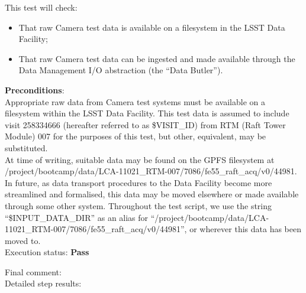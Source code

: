 \documentclass[DM,lsstdraft,STR,toc]{lsstdoc}
\providecommand{\tightlist}{
  \setlength{\itemsep}{0pt}\setlength{\parskip}{0pt}}
\begin{document}
    This test will check:

\begin{itemize}
\tightlist
\item
  That raw Camera test data is available on a filesystem in the LSST
  Data Facility;
\item
  That raw Camera test data can be ingested and made available through
  the Data Management I/O abstraction (the ``Data Butler'').
\end{itemize}


    {\bf Preconditions}:\\
    Appropriate raw data from Camera test systems must be available on a
filesystem within the LSST Data Facility. This test data is assumed to
include visit 258334666 (hereafter referred to as \$VISIT\_ID) from RTM
(Raft Tower Module) 007 for the purposes of this test, but other,
equivalent, may be substituted.\\[2\baselineskip]At time of writing,
suitable data may be found on the GPFS filesystem at
/project/bootcamp/data/LCA-11021\_RTM-007/7086/fe55\_raft\_acq/v0/44981.
In future, as data transport procedures to the Data Facility become more
streamlined and formalised, this data may be moved elsewhere or made
available through some other system. Throughout the test script, we use
the string ``\$INPUT\_DATA\_DIR'' as an alias for
``/project/bootcamp/data/LCA-11021\_RTM-007/7086/fe55\_raft\_acq/v0/44981'',
or wherever this data has been moved to.\\[2\baselineskip]


    Execution status: {\bf Pass }

    Final comment:\\


    Detailed step results:
\end{document}
